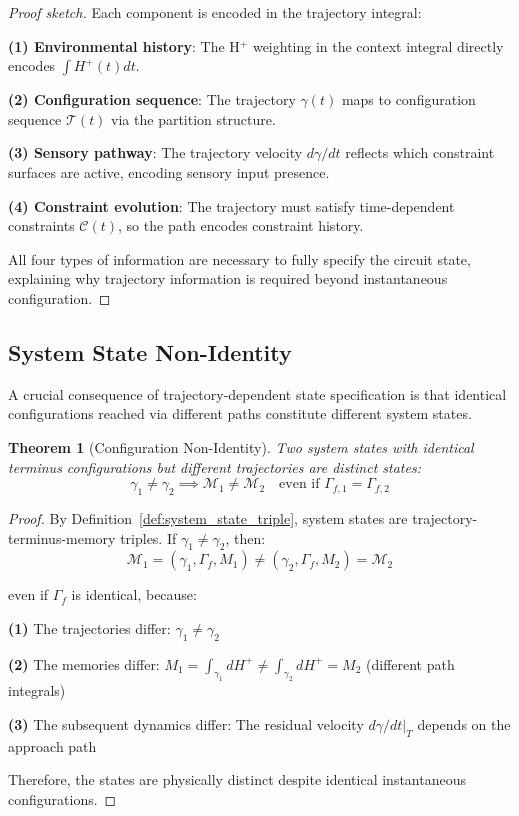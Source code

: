 \documentclass[aps,prd,twocolumn,superscriptaddress,floatfix,nofootinbib]{revtex4-2}
\newtheorem{theorem}{Theorem}[section]
\theoremstyle{remark}
\begin{document}
\begin{proof}[Proof sketch]
Each component is encoded in the trajectory integral:

\textbf{(1) Environmental history}: The H$^+$ weighting in the context integral directly encodes $\int H^+(t) dt$.

\textbf{(2) Configuration sequence}: The trajectory $\gamma(t)$ maps to configuration sequence $\mathcal{T}(t)$ via the partition structure.

\textbf{(3) Sensory pathway}: The trajectory velocity $d\gamma/dt$ reflects which constraint surfaces are active, encoding sensory input presence.

\textbf{(4) Constraint evolution}: The trajectory must satisfy time-dependent constraints $\mathcal{C}(t)$, so the path encodes constraint history.

All four types of information are necessary to fully specify the circuit state, explaining why trajectory information is required beyond instantaneous configuration.
\end{proof}

\subsection{System State Non-Identity}

A crucial consequence of trajectory-dependent state specification is that identical configurations reached via different paths constitute different system states.

\begin{theorem}[Configuration Non-Identity]
\label{thm:config_nonidentity}
Two system states with identical terminus configurations but different trajectories are distinct states:
\begin{equation}
\gamma_1 \neq \gamma_2 \implies \mathcal{M}_1 \neq \mathcal{M}_2 \quad \text{even if } \Gamma_{f,1} = \Gamma_{f,2}
\end{equation}
\end{theorem}

\begin{proof}
By Definition~\ref{def:system_state_triple}, system states are trajectory-terminus-memory triples. If $\gamma_1 \neq \gamma_2$, then:
$$
\mathcal{M}_1 = (\gamma_1, \Gamma_f, M_1) \neq (\gamma_2, \Gamma_f, M_2) = \mathcal{M}_2
$$

even if $\Gamma_f$ is identical, because:

\textbf{(1)} The trajectories differ: $\gamma_1 \neq \gamma_2$

\textbf{(2)} The memories differ: $M_1 = \int_{\gamma_1} dH^+ \neq \int_{\gamma_2} dH^+ = M_2$ (different path integrals)

\textbf{(3)} The subsequent dynamics differ: The residual velocity $d\gamma/dt|_T$ depends on the approach path

Therefore, the states are physically distinct despite identical instantaneous configurations.
\end{proof}
\end{document}
